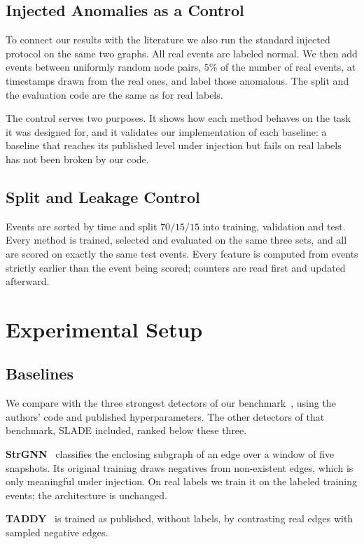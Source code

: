 \documentclass[pdflatex,sn-basic]{sn-jnl}
\theoremstyle{definition}
\theoremstyle{plain}
\begin{document}
\subsection{Injected Anomalies as a Control}
To connect our results with the literature we also run the standard injected
protocol on the same two graphs. All real events are labeled normal. We then
add events between uniformly random node pairs, $5\%$ of the number of real
events, at timestamps drawn from the real ones, and label those anomalous. The
split and the evaluation code are the same as for real labels.

The control serves two purposes. It shows how each method behaves on the task
it was designed for, and it validates our implementation of each baseline: a
baseline that reaches its published level under injection but fails on real
labels has not been broken by our code.

\subsection{Split and Leakage Control}
Events are sorted by time and split $70/15/15$ into training, validation and
test. Every method is trained, selected and evaluated on the same three sets,
and all are scored on exactly the same test events. Every feature is computed
from events strictly earlier than the event being scored; counters are read
first and updated afterward.

\section{Experimental Setup}
\label{sec:setup}

\subsection{Baselines}
We compare with the three strongest detectors of our
benchmark~\cite{nekka_survey}, using the authors' code and published
hyperparameters. The other detectors of that benchmark, SLADE included, ranked
below these three.

\textbf{StrGNN}~\cite{strgnn} classifies the enclosing subgraph of an edge over
a window of five snapshots. Its original training draws negatives from
non-existent edges, which is only meaningful under injection. On real labels
we train it on the labeled training events; the architecture is unchanged.

\textbf{TADDY}~\cite{taddy} is trained as published, without labels, by
contrasting real edges with sampled negative edges.
\end{document}
